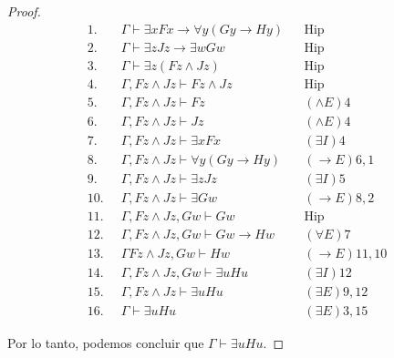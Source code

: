 \documentclass[letterpaper,11pt]{article}
\begin{document}
\begin{enumerate}
\begin{itemize}
\begin{proof}
                \begin{align*}
                    1. \; \; &\Gamma \vdash \exists x Fx \rightarrow 
                    \forall y(Gy \rightarrow Hy)
                    && \text{Hip} \\
                    2. \; \; &\Gamma \vdash \exists z Jz \rightarrow 
                    \exists w Gw
                    && \text{Hip} \\
                    3. \; \; &\Gamma \vdash \exists z(Fz \land Jz)
                    && \text{Hip} \\
                    4. \; \; &\Gamma, Fz \land Jz \vdash Fz \land Jz
                    && \text{Hip} \\
                    5. \; \; &\Gamma, Fz \land Jz \vdash Fz 
                    && \text{$(\land E) 4$} \\
                    6. \; \; &\Gamma, Fz \land Jz \vdash Jz
                    && \text{$(\land E) 4$} \\
                    7. \; \; &\Gamma, Fz \land Jz \vdash \exists x Fx
                    && \text{$(\exists I) 4$} \\
                    8. \; \; &\Gamma, Fz \land Jz \vdash \forall y(Gy 
                    \rightarrow Hy)
                    && \text{$(\rightarrow E) 6,1$} \\
                    9. \; \; &\Gamma, Fz \land Jz \vdash \exists z Jz
                    && \text{$(\exists I) 5$} \\
                    10. \; \; &\Gamma, Fz \land Jz \vdash \exists Gw
                    && \text{$(\rightarrow E) 8, 2$} \\
                    11. \; \;  &\Gamma, Fz \land Jz, Gw \vdash Gw 
                    && \text{Hip} \\
                    12. \; \; &\Gamma, Fz \land Jz, Gw \vdash Gw \rightarrow Hw
                    && \text{$(\forall E) 7$} \\
                    13. \; \; &\Gamma Fz \land Jz, Gw \vdash Hw 
                    && \text{$(\rightarrow E) 11,10$} \\
                    14. \; \; &\Gamma, Fz \land Jz, Gw \vdash \exists u Hu
                    && \text{$(\exists I) 12$} \\
                    15. \; \; &\Gamma, Fz \land Jz \vdash \exists u Hu
                    && \text{$(\exists E) 9, 12$} \\
                    16. \; \; &\Gamma \vdash \exists u Hu 
                    && \text{$(\exists E) 3, 15$}
                \end{align*}
                
                Por lo tanto, podemos concluir que $\Gamma \vdash \exists u Hu$.
            \end{proof}
        \end{itemize}
    \end{enumerate}
\end{document}
